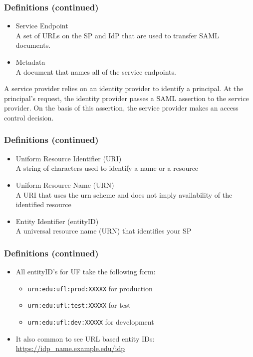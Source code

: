 \begin{frame}
\frametitle{Definitions (continued)}
\begin{itemize} %
\item Service Endpoint \\ A set of URLs on the SP and IdP that are used to transfer SAML documents.
\item Metadata \\ A document that names all of the service endpoints.
\end{itemize}
A service provider relies on an identity provider to identify a principal. At the principal's request, the identity provider passes a SAML assertion to the service provider. On the basis of this
assertion, the service provider makes an access control decision.
\end{frame}

\begin{frame}
\frametitle{Definitions (continued)}
\begin{itemize} %
\item Uniform Resource Identifier (URI) \\ A string of characters used to identify a name or a resource
\item Uniform Resource Name (URN) \\ A URI that uses the urn scheme and does not imply availability of the identified resource
\item Entity Identifier (entityID) \\ A universal resource name (URN) that identifies your SP
\end{itemize}
\end{frame}

\begin{frame}
\frametitle{Definitions (continued)}
\begin{itemize}
\item All entityID's for UF take the following form: \begin{itemize}
\item \texttt{urn:edu:ufl:prod:XXXXX} for production
\item \texttt{urn:edu:ufl:test:XXXXX} for test
\item \texttt{urn:edu:ufl:dev:XXXXX} for development
\end{itemize}
\item It also common to see URL based entity IDs: \url{https://idp_name.example.edu/idp}
\end{itemize}
\end{frame}


